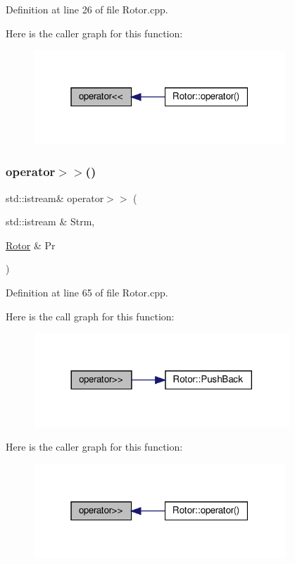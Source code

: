 Definition at line 26 of file Rotor.\+cpp.

Here is the caller graph for this function\+:
\nopagebreak
\begin{figure}[H]
\begin{center}
\leavevmode
\includegraphics[width=268pt]{_rotor_8hh_a6e6ce3bcc6ad0cb16d457ac8d73b3a7e_icgraph}
\end{center}
\end{figure}
\mbox{\label{_rotor_8hh_a2e505b0dd49c9d2cb7fb02a9ea8ad231}} 
\subsubsection{\texorpdfstring{operator$>$$>$()}{operator>>()}}
{\footnotesize\ttfamily std\+::istream\& operator$>$$>$ (\begin{DoxyParamCaption}\item[{std\+::istream \&}]{Strm,  }\item[{\hyperlink{class_rotor}{Rotor} \&}]{Pr }\end{DoxyParamCaption})}



Definition at line 65 of file Rotor.\+cpp.

Here is the call graph for this function\+:
\nopagebreak
\begin{figure}[H]
\begin{center}
\leavevmode
\includegraphics[width=272pt]{_rotor_8hh_a2e505b0dd49c9d2cb7fb02a9ea8ad231_cgraph}
\end{center}
\end{figure}
Here is the caller graph for this function\+:
\nopagebreak
\begin{figure}[H]
\begin{center}
\leavevmode
\includegraphics[width=268pt]{_rotor_8hh_a2e505b0dd49c9d2cb7fb02a9ea8ad231_icgraph}
\end{center}
\end{figure}
